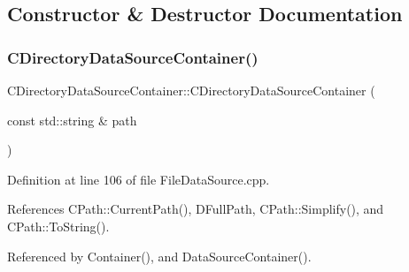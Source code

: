\subsection{Constructor \& Destructor Documentation}
\hypertarget{classCDirectoryDataSourceContainer_a62ef6d44201c6be66421b6c247f3b3bf}{}\label{classCDirectoryDataSourceContainer_a62ef6d44201c6be66421b6c247f3b3bf} 
\subsubsection{\texorpdfstring{C\+Directory\+Data\+Source\+Container()}{CDirectoryDataSourceContainer()}}
{\footnotesize\ttfamily C\+Directory\+Data\+Source\+Container\+::\+C\+Directory\+Data\+Source\+Container (\begin{DoxyParamCaption}\item[{const std\+::string \&}]{path }\end{DoxyParamCaption})}



Definition at line 106 of file File\+Data\+Source.\+cpp.



References C\+Path\+::\+Current\+Path(), D\+Full\+Path, C\+Path\+::\+Simplify(), and C\+Path\+::\+To\+String().



Referenced by Container(), and Data\+Source\+Container().



